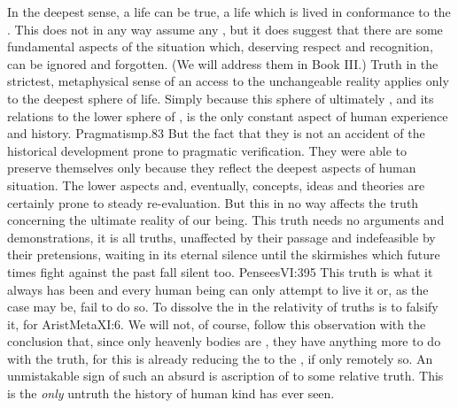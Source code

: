 In the deepest sense, a life can be true, a life which is lived in conformance
to the . This does not in any way assume any , but it does suggest that there are some fundamental aspects of the
 situation which, deserving respect and recognition, can be
ignored and forgotten. (We will address them in Book III.)  Truth in the
strictest, metaphysical sense of an access to the unchangeable reality applies
only to the deepest sphere of life.  Simply because this sphere of ultimately
, and its relations to the lower sphere of
, is the only constant aspect of human experience and history.
\citet{Our fundamental ways of thinking about things are discoveries of
  exceedingly remote ancestors, which have been able to preserve themselves
  throughout the experience of all subsequent times.}{Pragmatism}{p.83
  } But the fact that they  is not an accident of the historical development prone to
pragmatic verification. They were able to preserve themselves only because they
reflect the deepest aspects of human situation.  The lower aspects and,
eventually, concepts, ideas and theories are certainly prone to steady
re-evaluation.  But this in no way affects the truth concerning the ultimate
reality of our being. This truth needs no arguments and demonstrations, it is
 all truths, unaffected by their passage and indefeasible by their
pretensions, waiting in its eternal silence until the skirmishes which future
times fight against the past fall silent too. \citet{We have incapacity of
  proof, insurmountable by all dogmatism.  We have an idea of truth, invincible
  to all scepticism.}{Pensees}{VI:395} This truth is what it always has been and
every human being can only attempt to live it  or, as the case
may be, fail to do so.  To dissolve the  in the relativity of
 truths is to falsify it, for \citet{it is absurd to make the fact
  that the things of this earth are observed to change and never to remain in
  the same state, the basis of our judgment about the truth.}{AristMeta}{XI:6.
  We will not, of course, follow this observation with the conclusion that,
  since only heavenly bodies are , they have anything more to do with the  truth, for
  this is already reducing the  to the , if only
  remotely so.}  An unmistakable sign of such an absurd is ascription of
 to some relative truth.  This is the {\em only} 
untruth the history of human kind has ever seen.

